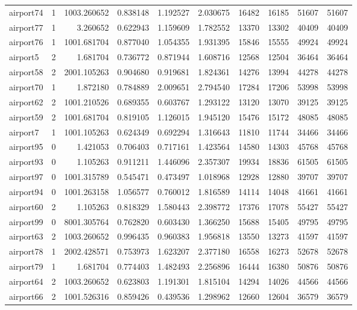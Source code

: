 \begin{longtable}{|l|r|r|r|r|r|r|r|r|r|}
airport74 & 1 & 1003.260652 & 0.838148 & 1.192527 & 2.030675 & 16482 & 16185 & 51607 & 51607 \\
airport77 & 1 & 3.260652 & 0.622943 & 1.159609 & 1.782552 & 13370 & 13302 & 40409 & 40409 \\
airport76 & 1 & 1001.681704 & 0.877040 & 1.054355 & 1.931395 & 15846 & 15555 & 49924 & 49924 \\
airport5 & 2 & 1.681704 & 0.736772 & 0.871944 & 1.608716 & 12568 & 12504 & 36464 & 36464 \\
airport58 & 2 & 2001.105263 & 0.904680 & 0.919681 & 1.824361 & 14276 & 13994 & 44278 & 44278 \\
airport70 & 1 & 1.872180 & 0.784889 & 2.009651 & 2.794540 & 17284 & 17206 & 53998 & 53998 \\
airport62 & 2 & 1001.210526 & 0.689355 & 0.603767 & 1.293122 & 13120 & 13070 & 39125 & 39125 \\
airport59 & 2 & 1001.681704 & 0.819105 & 1.126015 & 1.945120 & 15476 & 15172 & 48085 & 48085 \\
airport7 & 1 & 1001.105263 & 0.624349 & 0.692294 & 1.316643 & 11810 & 11744 & 34466 & 34466 \\
airport95 & 0 & 1.421053 & 0.706403 & 0.717161 & 1.423564 & 14580 & 14303 & 45768 & 45768 \\
airport93 & 0 & 1.105263 & 0.911211 & 1.446096 & 2.357307 & 19934 & 18836 & 61505 & 61505 \\
airport97 & 0 & 1001.315789 & 0.545471 & 0.473497 & 1.018968 & 12928 & 12880 & 39707 & 39707 \\
airport94 & 0 & 1001.263158 & 1.056577 & 0.760012 & 1.816589 & 14114 & 14048 & 41661 & 41661 \\
airport60 & 2 & 1.105263 & 0.818329 & 1.580443 & 2.398772 & 17376 & 17078 & 55427 & 55427 \\
airport99 & 0 & 8001.305764 & 0.762820 & 0.603430 & 1.366250 & 15688 & 15405 & 49795 & 49795 \\
airport63 & 2 & 1003.260652 & 0.996435 & 0.960383 & 1.956818 & 13550 & 13273 & 41597 & 41597 \\
airport78 & 1 & 2002.428571 & 0.753973 & 1.623207 & 2.377180 & 16558 & 16273 & 52678 & 52678 \\
airport79 & 1 & 1.681704 & 0.774403 & 1.482493 & 2.256896 & 16444 & 16380 & 50876 & 50876 \\
airport64 & 2 & 1003.260652 & 0.623803 & 1.191301 & 1.815104 & 14294 & 14026 & 44566 & 44566 \\
airport66 & 2 & 1001.526316 & 0.859426 & 0.439536 & 1.298962 & 12660 & 12604 & 36579 & 36579 \\

\end{longtable}
